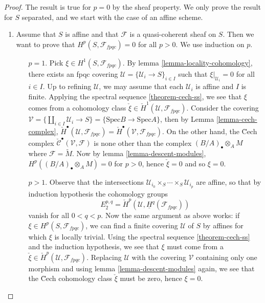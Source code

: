 \begin{proof}
The result is true for $p=0$ by the sheaf property. We only prove the result 
for $S$ separated, and we start with the case of an affine scheme.
\begin{enumerate}
\item
Assume that $S$ is affine and that $\mathcal{F}$ is a quasi-coherent sheaf on 
$S$. Then we want to prove that $H^p(S, \mathcal{F}_{fpqc}) = 0$ for all $p>0$. 
We use induction on $p$.
\begin{enumerate}
\item[$p=1$.]
Pick $\xi \in H^1(S, \mathcal{F}_{fpqc})$.
By lemma \ref{lemma-locality-cohomology}, 
there exists an fpqc covering
$\mathcal{U} = \{ \mathcal{U}_i \to S \}_{i \in I}$
such that $\xi|_{\mathcal{U}_i} = 0$ for all $i \in I$. Up to refining 
$\mathcal{U}$, we may assume that each $\mathcal{U}_i$ is affine and $I$ is 
finite. Applying the spectral sequence \ref{theorem-cech-ss}, 
we see that $\xi$ comes from a cohomology class $\check{\xi} \in \check 
H^1(\mathcal{U}, \mathcal{F}_{fpqc})$. Consider the covering $\mathcal{V} = \{ 
\coprod_{i\in I} \mathcal{U}_i \to S\} = \{ \text{Spec} B \to \text{Spec} A 
\}$, then by
Lemma \ref{lemma-cech-complex},
$\check H^\bullet(\mathcal{U}, \mathcal{F}_{fpqc}) =
\check H^\bullet(\mathcal{V}, \mathcal{F}_{fpqc})$.
On the  other hand, the \u Cech complex
$\check{\mathcal{C}}^\bullet (\mathcal{V}, \mathcal{F})$
is none other than the complex $(B/A)_\bullet \otimes_A M$ where 
$\mathcal{F} = \widetilde{M}$. Now by lemma \ref{lemma-descent-modules}, 
$H^p((B/A)_\bullet \otimes_A M) = 0$ for $p>0$, hence $\check{\xi} = 0$ and so 
$\xi = 0$.
\item[$p>1$.]
Observe that the intersections $\mathcal{U}_{i_0} \times_S \cdots \times_S 
\mathcal{U}_{i_p}$ are affine, so that by induction hypothesis the cohomology 
groups 
$$
E_2^{p,q} = \check H^p(\mathcal{U}, \underline{H}^q (\mathcal{F}_{fpqc}))
$$ 
vanish for all $0 < q < p$. Now the same argument as above works: if $\xi \in 
H^p(S, \mathcal{F}_{fpqc})$, we can find a finite covering $\mathcal{U}$ of $S$ 
by affines for which $\xi$ is locally trivial. Using the spectral sequence 
\ref{theorem-cech-ss} and the induction hypothesis, we see that 
$\xi$ must come from a $\check{\xi} \in \check H^p(\mathcal{U}, 
\mathcal{F}_{fpqc})$. Replacing $\mathcal{U}$ with the covering $\mathcal{V}$ 
containing only one morphism and using lemma \ref{lemma-descent-modules} again, 
we see that the \u Cech cohomology class $\check{\xi}$ must be zero, hence $\xi 
= 0$.
\end{enumerate}

\end{enumerate}
\end{proof}
